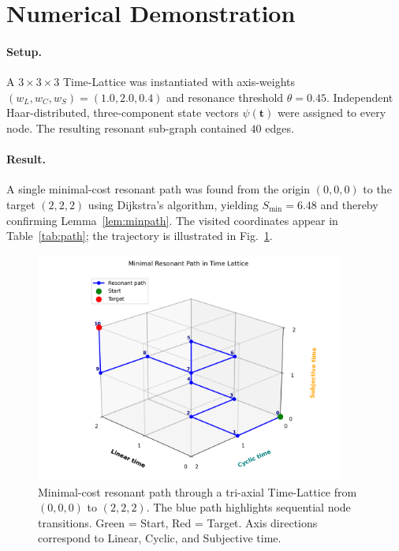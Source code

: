 \documentclass[11pt]{article}
\begin{document}
\section{Numerical Demonstration}\label{sec:numerics}
\paragraph{Setup.}\par
A $3\times3\times3$ Time-Lattice was instantiated with axis-weights
$(w_L,\allowbreak w_C,\allowbreak w_S)\allowbreak
=\allowbreak(1.0,\allowbreak 2.0,\allowbreak 0.4)$ and resonance
threshold $\theta = 0.45$. Independent Haar-distributed, three-component state
vectors $\psi(\mathbf t)$ were assigned to every node.
The resulting resonant sub-graph contained $40$ edges.

\paragraph{Result.}
A single minimal-cost resonant path was found from the origin
$(0,0,0)$ to the target $(2,2,2)$ using Dijkstra’s algorithm,
yielding $S_{\min}=6.48$ and thereby confirming
Lemma~\ref{lem:minpath}.  The visited coordinates appear in
Table~\ref{tab:path}; the trajectory is illustrated in
Fig.~\ref{fig:minpath}.

\begin{figure}[htbp!]
  \centering
  \includegraphics[width=0.9\textwidth]{figures/fig_minpath_with_labels.png}
  \caption{Minimal-cost resonant path through a tri-axial Time-Lattice from $(0,0,0)$ to $(2,2,2)$.
  The blue path highlights sequential node transitions. Green = Start, Red = Target.
  Axis directions correspond to Linear, Cyclic, and Subjective time.}
  \label{fig:minpath}
\end{figure}
\end{document}
